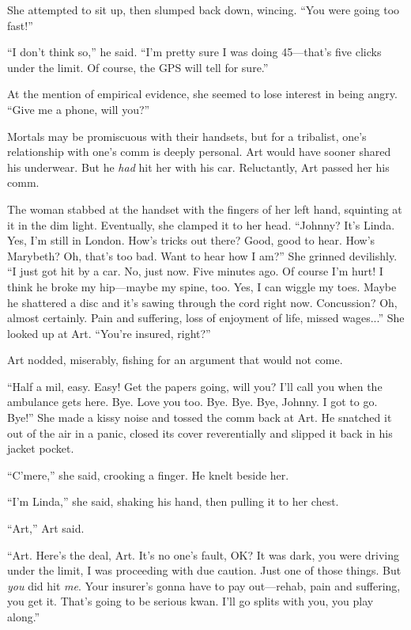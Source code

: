 She attempted to sit up, then slumped back down, wincing. “You were
going too fast!”

“I don’t think so,” he said. “I’m pretty sure I was doing 45—that’s
five clicks under the limit. Of course, the GPS will tell for
sure.”

At the mention of empirical evidence, she seemed to lose interest
in being angry. “Give me a phone, will you?”

Mortals may be promiscuous with their handsets, but for a
tribalist, one’s relationship with one’s comm is deeply personal.
Art would have sooner shared his underwear. But he \emph{had} hit
her with his car. Reluctantly, Art passed her his comm.

The woman stabbed at the handset with the fingers of her left hand,
squinting at it in the dim light. Eventually, she clamped it to her
head. “Johnny? It’s Linda. Yes, I’m still in London. How’s tricks
out there? Good, good to hear. How’s Marybeth? Oh, that’s too bad.
Want to hear how I am?” She grinned devilishly. “I just got hit by
a car. No, just now. Five minutes ago. Of course I’m hurt! I think
he broke my hip—maybe my spine, too. Yes, I can wiggle my toes.
Maybe he shattered a disc and it’s sawing through the cord right
now. Concussion? Oh, almost certainly. Pain and suffering, loss of
enjoyment of life, missed wages...” She looked up at Art. “You’re
insured, right?”

Art nodded, miserably, fishing for an argument that would not
come.

“Half a mil, easy. Easy! Get the papers going, will you? I’ll call
you when the ambulance gets here. Bye. Love you too. Bye. Bye. Bye,
Johnny. I got to go. Bye!” She made a kissy noise and tossed the
comm back at Art. He snatched it out of the air in a panic, closed
its cover reverentially and slipped it back in his jacket pocket.

“C’mere,” she said, crooking a finger. He knelt beside her.

“I’m Linda,” she said, shaking his hand, then pulling it to her
chest.

“Art,” Art said.

“Art. Here’s the deal, Art. It’s no one’s fault, OK? It was dark,
you were driving under the limit, I was proceeding with due
caution. Just one of those things. But \emph{you} did hit
\emph{me}. Your insurer’s gonna have to pay out—rehab, pain and
suffering, you get it. That’s going to be serious kwan. I’ll go
splits with you, you play along.”

